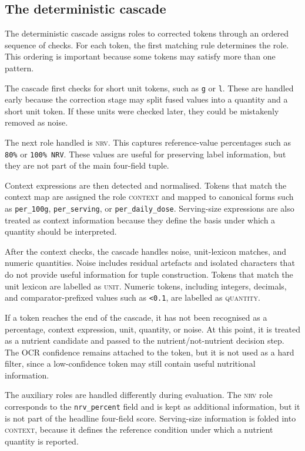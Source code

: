 \subsection{The deterministic cascade}\label{sec:classifier-cascade}

The deterministic cascade assigns roles to corrected tokens through an ordered sequence of checks. For each token, the first matching rule determines the role. This ordering is important because some tokens may satisfy more than one pattern.

The cascade first checks for short unit tokens, such as \texttt{g} or \texttt{l}. These are handled early because the correction stage may split fused values into a quantity and a short unit token. If these units were checked later, they could be mistakenly removed as noise.

The next role handled is \textsc{nrv}. This captures reference-value percentages such as \texttt{80\%} or \texttt{100\% NRV}. These values are useful for preserving label information, but they are not part of the main four-field tuple.

Context expressions are then detected and normalised. Tokens that match the context map are assigned the role \textsc{context} and mapped to canonical forms such as \texttt{per\_100g}, \texttt{per\_serving}, or \texttt{per\_daily\_dose}. Serving-size expressions are also treated as context information because they define the basis under which a quantity should be interpreted.

After the context checks, the cascade handles noise, unit-lexicon matches, and numeric quantities. Noise includes residual artefacts and isolated characters that do not provide useful information for tuple construction. Tokens that match the unit lexicon are labelled as \textsc{unit}. Numeric tokens, including integers, decimals, and comparator-prefixed values such as \texttt{<0.1}, are labelled as \textsc{quantity}.

If a token reaches the end of the cascade, it has not been recognised as a percentage, context expression, unit, quantity, or noise. At this point, it is treated as a nutrient candidate and passed to the nutrient/not-nutrient decision step. The OCR confidence remains attached to the token, but it is not used as a hard filter, since a low-confidence token may still contain useful nutritional information.

The auxiliary roles are handled differently during evaluation. The \textsc{nrv} role corresponds to the \texttt{nrv\_percent} field and is kept as additional information, but it is not part of the headline four-field score. Serving-size information is folded into \textsc{context}, because it defines the reference condition under which a nutrient quantity is reported.

